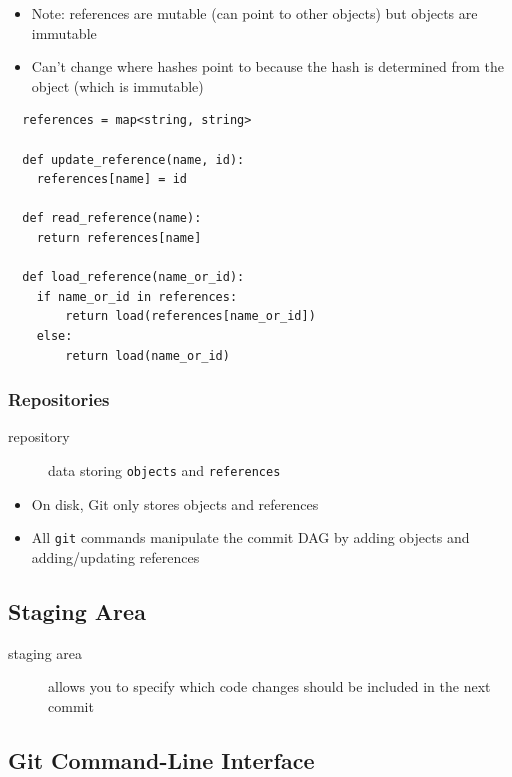 \documentclass[letterpaper,12pt]{article}
\begin{document}
\begin{itemize}
 \item Note: references are mutable (can point to other objects) but objects are immutable
 \item Can't change where hashes point to because the hash is determined from the object (which is immutable)
\end{itemize}

\begin{lstlisting}
  references = map<string, string>

  def update_reference(name, id):
    references[name] = id

  def read_reference(name):
    return references[name]

  def load_reference(name_or_id):
    if name_or_id in references:
        return load(references[name_or_id])
    else:
        return load(name_or_id)
\end{lstlisting}

\subsubsection{Repositories}
\begin{description}
 \item[repository] data storing \lstinline{objects} and \lstinline{references}
\end{description}

\begin{itemize}
 \item On disk, Git only stores objects and references
 \item All \lstinline{git} commands manipulate the commit DAG by adding objects and adding/updating references
\end{itemize}

\subsection{Staging Area}
\begin{description}
 \item[staging area] allows you to specify which code changes should be included in the next commit
\end{description}

\subsection{Git Command-Line Interface}
\end{document}
